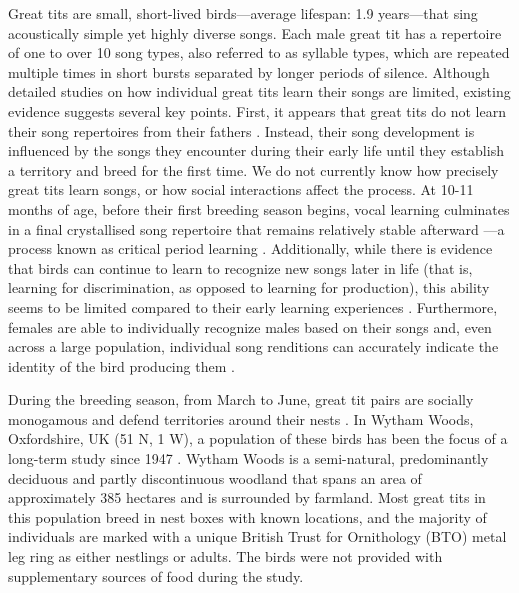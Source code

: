 \documentclass[9pt, onecolumn, twoside, lineno]{gsajnl}
\begin{document}
Great tits are small, short-lived birds---average lifespan: 1.9 years---that sing acoustically simple yet highly diverse songs. Each male great tit has a repertoire of one to over 10 song types, also referred to as syllable types, which are repeated multiple times in short bursts separated by longer periods of silence. Although detailed studies on how individual great tits learn their songs are limited, existing evidence suggests several key points. First, it appears that great tits do not learn their song repertoires from their fathers \autocite{mcgregor1982b}. Instead, their song development is influenced by the songs they encounter during their early life until they establish a territory and breed for the first time. We do not currently know how precisely great tits learn songs, or how social interactions affect the process. At 10-11 months of age, before their first breeding season begins, vocal learning culminates in a final crystallised song repertoire that remains relatively stable afterward \autocite{rivera-gutierrez2011}---a process known as critical period learning \autocite{nottebohm1999, thorpe1958a}. Additionally, while there is evidence that birds can continue to learn to recognize new songs later in life (that is, learning for  discrimination, as opposed to learning for production), this ability seems to be limited compared to their early learning experiences \autocite{mcgregor1986}. Furthermore, females are able to individually recognize males based on their songs \autocite{lind1996} and, even across a large population, individual song renditions can accurately indicate the identity of the bird producing them \autocite{merinorecalde2023a}.

During the breeding season, from March to June, great tit pairs are socially monogamous and defend territories around their nests \autocite{hinde1952}. In Wytham Woods, Oxfordshire, UK (51 N, 1 W), a population of these birds has been the focus of a long-term study since 1947 \autocite{lack1964}. Wytham Woods is a semi-natural, predominantly deciduous and partly discontinuous woodland that spans an area of approximately 385 hectares and is surrounded by farmland. Most great tits in this population breed in nest boxes with known locations, and the majority of individuals are marked with a unique British Trust for Ornithology (BTO) metal leg ring as either nestlings or adults. The birds were not provided with supplementary sources of food during the study.
\end{document}
